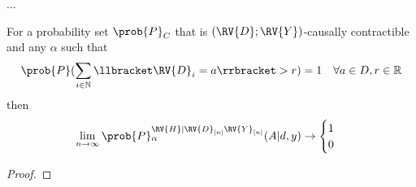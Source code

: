 \begin{lemma}
...
\end{lemma}


\begin{theorem}
For a probability set $\prob{P}_C$ that is $(\RV{D};\RV{Y})$-causally contractible and any $\alpha$ such that
\begin{align}
	\prob{P}(\sum_{i\in\mathbb{N}} \llbracket \RV{D}_i = a \rrbracket > r) &= 1 &\forall a\in D,r\in\mathbb{R}
\end{align}
then
\begin{align}
	\lim_{n\to \infty}\prob{P}_\alpha^{\RV{H}|\RV{D}_{[n]}\RV{Y}_{[n]}}(A|d,y) \to \begin{cases}
	1\\ 
	0
	\end{cases}
\end{align}
\end{theorem}

\begin{proof}

\end{proof}